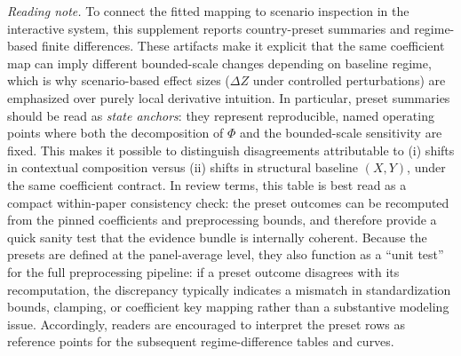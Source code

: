 \documentclass[11pt]{article}
\begin{document}
\noindent\justifying
\textit{Reading note.} To connect the fitted mapping to scenario inspection in the interactive system, this supplement reports
country-preset summaries and regime-based finite differences. These artifacts make it explicit that the same
coefficient map can imply different bounded-scale changes depending on baseline regime, which is why scenario-based
effect sizes ($\Delta Z$ under controlled perturbations) are emphasized over purely local derivative intuition.
\noindent\justifying
In particular, preset summaries should be read as \emph{state anchors}: they represent reproducible, named operating points where both the decomposition of $\Phi$ and the bounded-scale sensitivity are fixed.
This makes it possible to distinguish disagreements attributable to (i) shifts in contextual composition versus (ii) shifts in structural baseline $(X,Y)$, under the same coefficient contract.
In review terms, this table is best read as a compact within-paper consistency check: the preset outcomes can be recomputed from the pinned coefficients and preprocessing bounds, and therefore provide a quick sanity test that the evidence bundle is internally coherent.
Because the presets are defined at the panel-average level, they also function as a ``unit test'' for the full preprocessing pipeline: if a preset outcome disagrees with its recomputation, the discrepancy typically indicates a mismatch in standardization bounds, clamping, or coefficient key mapping rather than a substantive modeling issue.
Accordingly, readers are encouraged to interpret the preset rows as reference points for the subsequent regime-difference tables and curves.
\end{document}
